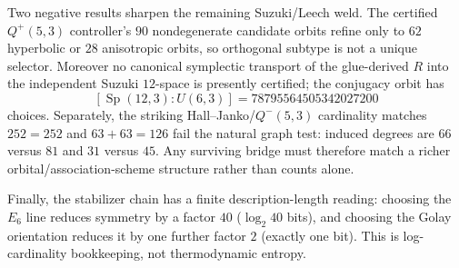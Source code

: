 Two negative results sharpen the remaining Suzuki/Leech weld.  The certified
$Q^+(5,3)$ controller's $90$ nondegenerate candidate orbits refine only to $62$
hyperbolic or $28$ anisotropic orbits, so orthogonal subtype is not a unique
selector.  Moreover no canonical symplectic transport of the glue-derived $R$
into the independent Suzuki $12$-space is presently certified; the conjugacy
orbit has
\[
 [\operatorname{Sp}(12,3):U(6,3)]=78795564505342027200
\]
choices.  Separately, the striking Hall--Janko/$Q^-(5,3)$ cardinality matches
$252=252$ and $63+63=126$ fail the natural graph test: induced degrees are
$66$ versus $81$ and $31$ versus $45$.  Any surviving bridge must therefore
match a richer orbital/association-scheme structure rather than counts alone.

Finally, the stabilizer chain has a finite description-length reading:
choosing the $E_6$ line reduces symmetry by a factor $40$ ($\log_2 40$ bits),
and choosing the Golay orientation reduces it by one further factor $2$ (exactly
one bit).  This is log-cardinality bookkeeping, not thermodynamic entropy.
